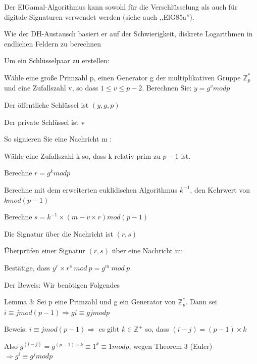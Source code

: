 \documentclass[a4paper]{article}
\begin{document}
\begin{multicols}{3}
      \begin{itemize*}
            \item Der ElGamal-Algorithmus kann sowohl für die Verschlüsselung als auch
            für digitale Signaturen verwendet werden (siehe auch ,,ElG85a'').
            \item Wie der DH-Austausch basiert er auf der Schwierigkeit, diskrete
            Logarithmen in endlichen Feldern zu berechnen
            \item Um ein Schlüsselpaar zu erstellen:
            \begin{itemize*}
                  \item Wähle eine große Primzahl p, einen Generator g der multiplikativen Gruppe $\mathbb{Z}^*_p$ und eine Zufallszahl v, so dass $1\leq v\leq p - 2$. Berechnen Sie: $y=g^v mod p$
                  \item Der öffentliche Schlüssel ist $( y, g, p )$
                  \item Der private Schlüssel ist v
            \end{itemize*}
            \item So signieren Sie eine Nachricht m :
            \begin{itemize*}
                  \item Wähle eine Zufallszahl k so, dass k relativ prim zu $p-1$ ist.
                  \item Berechne $r=g^k mod p$
                  \item Berechne mit dem erweiterten euklidischen Algorithmus $k^{-1}$, den Kehrwert von $k mod (p - 1)$
                  \item Berechne $s=k^{-1} \times ( m - v \times r) mod ( p - 1)$
                  \item Die Signatur über die Nachricht ist $( r, s )$
            \end{itemize*}
            \item Überprüfen einer Signatur $( r , s )$ über eine Nachricht m:
            \begin{itemize*}
                  \item Bestätige, dass $y^r \times r^s\ mod\ p = g^m\ mod\ p$
                  \item Der Beweis: Wir benötigen Folgendes
                  \begin{itemize*} \item Lemma 3: Sei p eine Primzahl und g ein Generator von $\mathbb{Z}^*_p$. Dann sei $i \equiv j mod ( p -1) \Rightarrow g i \equiv g j mod p$ \item Beweis: $i \equiv j mod (p-1) \Rightarrow$ es gibt $k\in \mathbb{Z}^+$ so, dass $(i-j)=(p-1)\times k$ \item Also $g^{(i-j)}=g^{(p-1)\times k} \equiv 1^k\equiv 1 mod p$, wegen Theorem 3 (Euler) $\Rightarrow g^i \equiv g^j mod p$ \end{itemize*}

\end{itemize*}
\end{itemize*}
\end{multicols}
\end{document}
